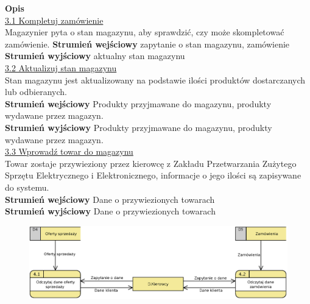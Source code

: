 \textbf{Opis} \\
\underline{3.1 Kompletuj zamówienie}\\
Magazynier pyta o stan magazynu, aby sprawdzić, czy może skompletować zamówienie.
\textbf{Strumień wejściowy} zapytanie o stan magazynu, zamówienie\\
\textbf{Strumień wyjściowy} aktualny stan magazynu\\

\underline{3.2 Aktualizuj stan magazynu}\\ 
Stan magazynu jest aktualizowany na podstawie ilości produktów dostarczanych lub odbieranych.\\	
\textbf{Strumień wejściowy} Produkty przyjmawane do magazynu, produkty wydawane przez magazyn.\\
\textbf{Strumień wyjściowy} Produkty przyjmawane do magazynu, produkty wydawane przez magazyn.\\
\underline{3.3 Wprowadź towar do magazynu}\\
Towar zostaje przywieziony przez kierowcę z Zakładu Przetwarzania Zużytego Sprzętu Elektrycznego i Elektronicznego, informacje o jego ilości są zapisywane do systemu.\\
\textbf{Strumień wejściowy} Dane o przywiezionych towarach\\
\textbf{Strumień wyjściowy} Dane o przywiezionych towarach



	\begin{figure}[H]
		\centering
		\centerline{\includegraphics[width=1.1\textwidth]{img/DFD/2-level-kierowcy.eps}}
	\end{figure}
